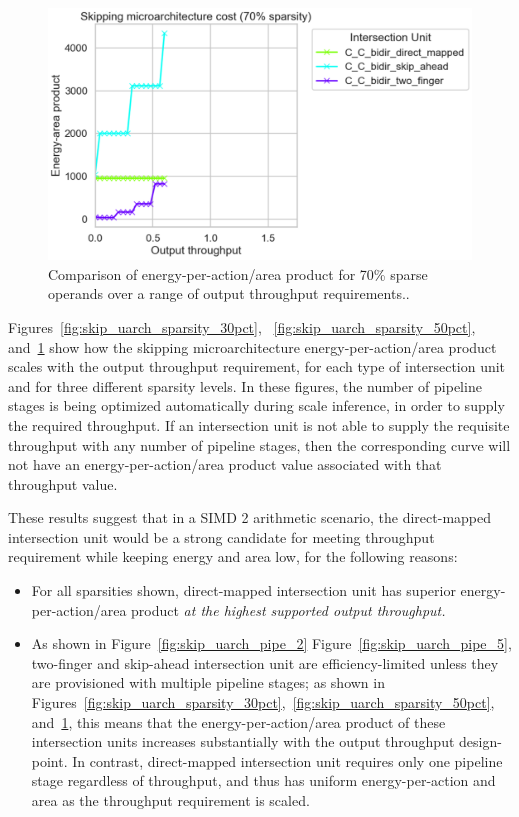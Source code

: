 \begin{figure}[H]
\includegraphics[width=\textwidth]{figures/skip_uarch_sparsity_70pct.png}
\caption{Comparison of energy-per-action/area product for 70\% sparse operands over a range of output throughput requirements..}
\label{fig:skip_uarch_sparsity_70pct}
\end{figure}

Figures~\ref{fig:skip_uarch_sparsity_30pct}, 
~\ref{fig:skip_uarch_sparsity_50pct}, and~\ref{fig:skip_uarch_sparsity_70pct} show how the skipping microarchitecture energy-per-action/area product scales with the output throughput requirement, for each type of intersection unit and for three different sparsity levels. In these figures, the number of pipeline stages is being optimized automatically during scale inference, in order to supply the required throughput. If an intersection unit is not able to supply the requisite throughput with any number of pipeline stages, then the corresponding curve will not have an energy-per-action/area product value associated with that throughput value.

These results suggest that in a SIMD 2 arithmetic scenario, the direct-mapped intersection unit would be a strong candidate for meeting throughput requirement while keeping energy and area low, for the following reasons:

\begin{itemize}
    \item For all sparsities shown, direct-mapped intersection unit has superior energy-per-action/area product \textit{at the highest supported output throughput.}
    \item As shown in Figure~\ref{fig:skip_uarch_pipe_2} Figure~\ref{fig:skip_uarch_pipe_5}, two-finger and skip-ahead intersection unit are efficiency-limited unless they are provisioned with multiple pipeline stages; as shown in Figures~\ref{fig:skip_uarch_sparsity_30pct},~\ref{fig:skip_uarch_sparsity_50pct}, and~\ref{fig:skip_uarch_sparsity_70pct}, this means that the energy-per-action/area product of these intersection units increases substantially with the output throughput design-point. In contrast, direct-mapped intersection unit requires only one pipeline stage regardless of throughput, and thus has uniform energy-per-action and area as the throughput requirement is scaled.
\end{itemize}


